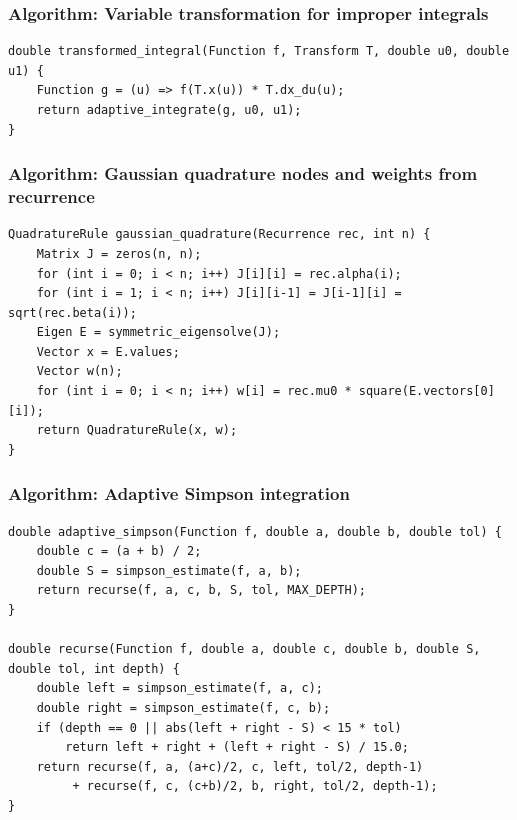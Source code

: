 \documentclass[11pt]{article}
\begin{document}
\subsubsection{Algorithm: Variable transformation for improper integrals}\label{algorithm-variable-transformation-for-improper-integrals}

\begin{verbatim}
double transformed_integral(Function f, Transform T, double u0, double u1) {
    Function g = (u) => f(T.x(u)) * T.dx_du(u);
    return adaptive_integrate(g, u0, u1);
}
\end{verbatim}

\subsubsection{Algorithm: Gaussian quadrature nodes and weights from recurrence}\label{algorithm-gaussian-quadrature-nodes-and-weights-from-recurrence}

\begin{verbatim}
QuadratureRule gaussian_quadrature(Recurrence rec, int n) {
    Matrix J = zeros(n, n);
    for (int i = 0; i < n; i++) J[i][i] = rec.alpha(i);
    for (int i = 1; i < n; i++) J[i][i-1] = J[i-1][i] = sqrt(rec.beta(i));
    Eigen E = symmetric_eigensolve(J);
    Vector x = E.values;
    Vector w(n);
    for (int i = 0; i < n; i++) w[i] = rec.mu0 * square(E.vectors[0][i]);
    return QuadratureRule(x, w);
}
\end{verbatim}

\subsubsection{Algorithm: Adaptive Simpson integration}\label{algorithm-adaptive-simpson-integration}

\begin{verbatim}
double adaptive_simpson(Function f, double a, double b, double tol) {
    double c = (a + b) / 2;
    double S = simpson_estimate(f, a, b);
    return recurse(f, a, c, b, S, tol, MAX_DEPTH);
}

double recurse(Function f, double a, double c, double b, double S, double tol, int depth) {
    double left = simpson_estimate(f, a, c);
    double right = simpson_estimate(f, c, b);
    if (depth == 0 || abs(left + right - S) < 15 * tol)
        return left + right + (left + right - S) / 15.0;
    return recurse(f, a, (a+c)/2, c, left, tol/2, depth-1)
         + recurse(f, c, (c+b)/2, b, right, tol/2, depth-1);
}
\end{verbatim}
\end{document}
